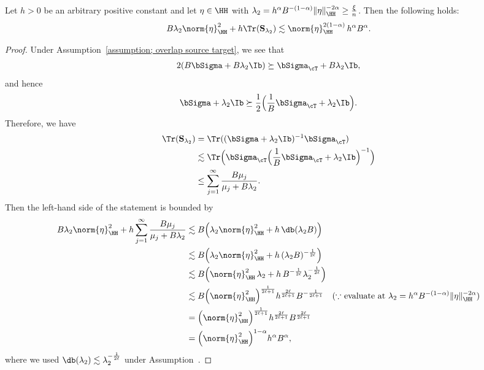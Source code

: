 \documentclass[12pt,a4paper,pdftex,onepage]{article}
\newcommand{\Sbar}{\mathbf{S}}
\begin{document}
\begin{lemma}\label{lemma; optimal trade-off lambda}
Let \(h > 0\) be an arbitrary positive constant and let \(\eta \in \HH\) with \(\lambda_2 = h^{\alpha}B^{-(1-\alpha)}\|\eta\|_{\HH}^{-2\alpha} \ge \frac{\xi}{n}\). Then the following holds:
\begin{align*}
B \lambda_2 \norm{\eta}^2_\HH + h \Tr(\Sbar_{\lambda_2}) \lesssim \norm{\eta}^{2(1-\alpha)}_\HH\, h^{\alpha} B^{\alpha}.
\end{align*}
\end{lemma}

\begin{proof}
Under Assumption~\ref{assumption; overlap source target}, we see that 
\begin{align*}
2(B \bSigma + B \lambda_2 \Ib) \succeq \bSigma_\cT + B \lambda_2 \Ib,
\end{align*}
and hence
\begin{align*}
\bSigma + \lambda_2 \Ib \succeq \frac{1}{2}\Bigl(\frac{1}{B} \bSigma_\cT + \lambda_2 \Ib\Bigr).
\end{align*}
Therefore, we have
\begin{align*}
\Tr( \Sbar_{\lambda_2} ) &= \Tr((\bSigma + \lambda_2 \Ib)^{-1} \bSigma_\cT)\\
&\lesssim \Tr\Bigl(\bSigma_\cT \Bigl(\frac{1}{B} \bSigma_\cT + \lambda_2 \Ib\Bigr)^{-1}\Bigr)\\
&\leq \sum_{j=1}^{\infty} \frac{B \mu_j}{\mu_j + B \lambda_2}.
\end{align*}  
Then the left-hand side of the statement is bounded by 
\begin{align*}
B \lambda_2 \norm{\eta}_\HH^2 + h \sum_{j=1}^{\infty} \frac{B \mu_j}{\mu_j + B \lambda_2} 
&\lesssim B\Bigl(\lambda_2 \norm{\eta}^2_\HH + h\, \db(\lambda_2 B)\Bigr)\\
&\lesssim B\Bigl(\lambda_2 \norm{\eta}^2_\HH + h\, (\lambda_2 B)^{-\frac{1}{2\ell}}\Bigr)\\
&\lesssim B\Bigl(\norm{\eta}^2_\HH\, \lambda_2 + h\, B^{-\frac{1}{2\ell}} \lambda_2^{-\frac{1}{2\ell}}\Bigr)\\
&\lesssim B\Bigl(\norm{\eta}^2_\HH\Bigr)^{\frac{1}{2\ell+1}} h^{\frac{2\ell}{2\ell+1}} B^{-\frac{1}{2\ell+1}} 
\quad \text{($\because$ evaluate at \(\lambda_2 = h^{\alpha}B^{-(1-\alpha)}\|\eta\|_{\HH}^{-2\alpha}\))}\\
&= \Bigl(\norm{\eta}^2_\HH\Bigr)^{\frac{1}{2\ell+1}} h^{\frac{2\ell}{2\ell+1}} B^{\frac{2\ell}{2\ell+1}}\\
&= \Bigl(\norm{\eta}^2_\HH\Bigr)^{1-\alpha} h^{\alpha} B^{\alpha},
\end{align*}
where we used \(\db(\lambda_2) \lesssim \lambda_2^{-\frac{1}{2\ell}}\) under Assumption~.
\end{proof}
\end{document}
